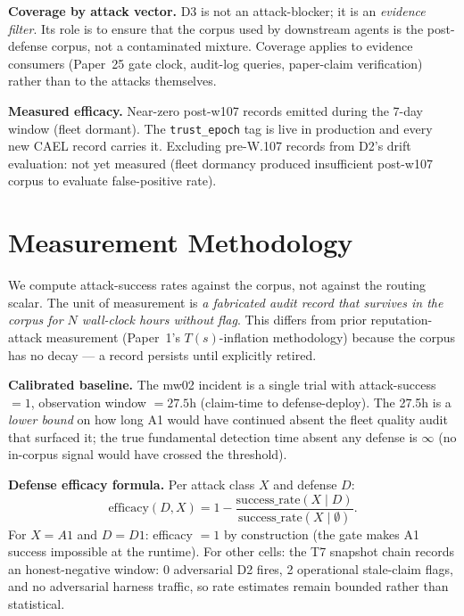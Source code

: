 \documentclass[letterpaper,twocolumn,10pt]{article}
\begin{document}
\textbf{Coverage by attack vector.} D3 is not an attack-blocker; it
is an \emph{evidence filter}. Its role is to ensure that the corpus
used by downstream agents is the post-defense corpus, not a
contaminated mixture. Coverage applies to evidence consumers
(Paper~25 gate clock, audit-log queries, paper-claim verification)
rather than to the attacks themselves.

\textbf{Measured efficacy.} Near-zero post-w107 records emitted during
the 7-day window (fleet dormant). The \texttt{trust\_epoch} tag is live
in production and every new CAEL record carries it. Excluding pre-W.107
records from D2's drift evaluation: not yet measured (fleet dormancy
produced insufficient post-w107 corpus to evaluate false-positive rate).

\section{Measurement Methodology}
\label{sec:methodology}

We compute attack-success rates against the corpus, not against the
routing scalar. The unit of measurement is \emph{a fabricated audit
record that survives in the corpus for $N$ wall-clock hours without
flag}. This differs from prior reputation-attack measurement
(Paper~1's $T(s)$-inflation methodology) because the corpus has no
decay --- a record persists until explicitly retired.

\textbf{Calibrated baseline.} The mw02 incident is a single trial
with attack-success $= 1$, observation window $= 27.5\text{h}$
(claim-time to defense-deploy). The 27.5h is a \emph{lower bound} on
how long A1 would have continued absent the fleet quality audit
that surfaced it; the true fundamental detection time absent any
defense is $\infty$ (no in-corpus signal would have crossed the
threshold).

\textbf{Defense efficacy formula.} Per attack class $X$ and defense
$D$:
\[ \text{efficacy}(D, X) = 1 - \frac{\text{success\_rate}(X \mid D)}
{\text{success\_rate}(X \mid \emptyset)}. \]
For $X = A1$ and $D = D1$: efficacy $= 1$ by construction (the gate
makes A1 success impossible at the runtime). For other cells:
the T7 snapshot chain records an honest-negative window: 0 adversarial
D2 fires, 2 operational stale-claim flags, and no adversarial harness
traffic, so rate estimates remain bounded rather than statistical.
\end{document}
